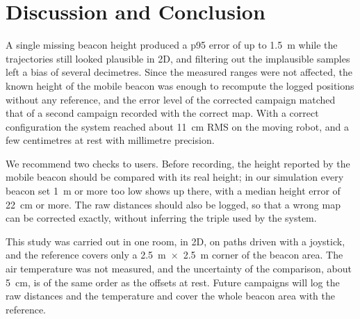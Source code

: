 \documentclass[conference]{IEEEtran}
\begin{document}
\section{Discussion and Conclusion}
A single missing beacon height produced a p95 error of up to \SI{1.5}{m} while the trajectories still looked
plausible in 2D, and filtering out the implausible samples left a bias of several decimetres. Since the
measured ranges were not affected, the known height of the mobile beacon was enough to recompute the
logged positions without any reference, and the error level of the corrected campaign matched that of a second campaign recorded
with the correct map. With a correct configuration the system reached about \SI{11}{cm} RMS on the
moving robot, and a few centimetres at rest with millimetre precision.

We recommend two checks to users. Before recording, the height reported by the mobile beacon should be
compared with its real height; in our simulation every beacon set \SI{1}{m} or more too low shows up
there, with a median height error of \SI{22}{cm} or more. The raw distances should
also be logged, so that a wrong map can be corrected exactly, without inferring the triple used by the
system.

This study was carried out in one room, in 2D, on paths driven with a joystick, and the
reference covers only a \SI{2.5}{m}~$\times$~\SI{2.5}{m} corner of the beacon area. The air
temperature was not measured, and the uncertainty of the comparison, about \SI{5}{cm}, is of the same
order as the offsets at rest. Future campaigns will log the raw distances and the temperature and
cover the whole beacon area with the reference.



\end{document}
